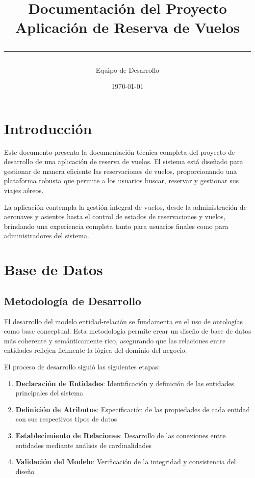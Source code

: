 \documentclass[12pt,a4paper]{article}
\title{\textbf{\Huge Documentación del Proyecto}\\
\vspace{0.5cm}
\textbf{\Large Aplicación de Reserva de Vuelos}\\
\vspace{0.3cm}
\textcolor{primaryblue}{\rule{\textwidth}{2pt}}}
\author{Equipo de Desarrollo}
\date{\today}
\begin{document}
\maketitle
\thispagestyle{empty}

\newpage
\tableofcontents
\newpage

\section{Introducción}

Este documento presenta la documentación técnica completa del proyecto de desarrollo de una aplicación de reserva de vuelos. El sistema está diseñado para gestionar de manera eficiente las reservaciones de vuelos, proporcionando una plataforma robusta que permite a los usuarios buscar, reservar y gestionar sus viajes aéreos.

La aplicación contempla la gestión integral de vuelos, desde la administración de aeronaves y asientos hasta el control de estados de reservaciones y vuelos, brindando una experiencia completa tanto para usuarios finales como para administradores del sistema.

\section{Base de Datos}

\subsection{Metodología de Desarrollo}

El desarrollo del modelo entidad-relación se fundamenta en el uso de ontologías como base conceptual. Esta metodología permite crear un diseño de base de datos más coherente y semánticamente rico, asegurando que las relaciones entre entidades reflejen fielmente la lógica del dominio del negocio.

El proceso de desarrollo siguió las siguientes etapas:

\begin{enumerate}
    \item \textbf{Declaración de Entidades}: Identificación y definición de las entidades principales del sistema
    \item \textbf{Definición de Atributos}: Especificación de las propiedades de cada entidad con sus respectivos tipos de datos
    \item \textbf{Establecimiento de Relaciones}: Desarrollo de las conexiones entre entidades mediante análisis de cardinalidades
    \item \textbf{Validación del Modelo}: Verificación de la integridad y consistencia del diseño
\end{enumerate}
\end{document}
